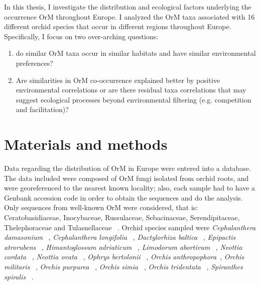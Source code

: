 In this thesis, I investigate the distribution and ecological factors underlying the occurrence OrM throughout Europe. I analyzed the OrM taxa associated with 16 different orchid species that occur in different regions throughout Europe. Specifically, I focus on two over-arching questions:

\begin{enumerate}
\item do similar OrM taxa occur in similar habitats and have similar environmental preferences?

\item Are similarities in OrM co-occurrence explained better by positive environmental correlations or are there residual taxa correlations that may suggest ecological processes beyond environmental filtering (e.g. competition and facilitation)?

\end{enumerate}

\part{Materials and methods}
\label{materialsandmethods}

Data regarding the distribution of OrM in Europe were entered into a database. The data included were composed of OrM fungi isolated from orchid roots, and were georeferenced to the nearest known locality; also, each sample had to have a Genbank accession code in order to obtain the sequences and do the analysis.
Only sequences from well-known OrM were considered, that is: Ceratobasidiaceae, Inocybaceae, Russulaceae, Sebacinaceae, Serendipitaceae, Thelephoraceae and Tulasnellaceae ~\citep{dearnaley2012}.
Orchid species sampled were \emph{Cephalanthera damasonium} ~\citep{julou2005}, \emph{Cephalanthera longifolia} ~\citep{pecoraro2017}, \emph{Dactylorhiza baltica} ~\citep{shefferson2008}, \emph{Epipactis atrorubens} ~\citep{shefferson2008}, \emph{Himantoglossum adriaticum} ~\citep{pecoraro2013}, \emph{Limodorum abortivum} ~\citep{girlanda2005}, \emph{Neottia cordata} ~\citep{tesitelova2015}, \emph{Neottia ovata} ~\citep{hansjacquemyn2015, tesitelova2015}, \emph{Ophrys bertolonii} ~\citep{pecoraro2015}, \emph{Orchis anthropophora}~\citep{julou2005}, \emph{Orchis militaris} ~\citep{shefferson2008}, \emph{Orchis purpurea} ~\citep{lievens2010}, \emph{Orchis simia} ~\citep{schatz2010, lievens2010}, \emph{Orchis tridentata} ~\citep{pecoraro2012}, \emph{Spiranthes spiralis} ~\citep{duffy2019}.

